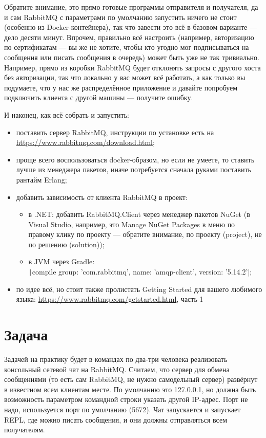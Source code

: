 \documentclass{../../text-style}
\begin{document}
Обратите внимание, это прямо готовые программы отправителя и получателя, да и сам RabbitMQ с параметрами по умолчанию запустить ничего не стоит (особенно из Docker-контейнера), так что завести это всё в базовом варианте --- дело десяти минут. Впрочем, правильно всё настроить (например, авторизацию по сертификатам --- вы же не хотите, чтобы кто угодно мог подписываться на сообщения или писать сообщения в очередь) может быть уже не так тривиально. Например, прямо из коробки RabbitMQ будет отклонять запросы с другого хоста без авторизации, так что локально у вас может всё работать, а как только вы подумаете, что у нас же распределённое приложение и давайте попробуем подключить клиента с другой машины --- получите ошибку.

И наконец, как всё собрать и запустить:

\begin{itemize}
    \item поставить сервер RabbitMQ, инструкции по установке есть на \url{https://www.rabbitmq.com/download.html};
    \item проще всего воспользоваться docker-образом, но если не умеете, то ставить лучше из менеджера пакетов, иначе потребуется сначала руками поставить рантайм Erlang;
    \item добавить зависимость от клиента RabbitMQ в проект:
    \begin{itemize}
        \item в .NET: добавить RabbitMQ.Client через менеджер пакетов NuGet (в Visual Studio, например, это Manage NuGet Packages в меню по правому клику по проекту --- обратите внимание, по проекту (project), не по решению (solution));
        \item в JVM через Gradle: \\
        \texttt|compile group: 'com.rabbitmq', name: 'amqp-client', version: '5.14.2'|;
    \end{itemize}
    \item по идее всё, но стоит также пролистать Getting Started для вашего любимого языка: \url{https://www.rabbitmq.com/getstarted.html}, часть 1
\end{itemize}

\section{Задача}

Задачей на практику будет в командах по два-три человека реализовать консольный сетевой чат на RabbitMQ. Считаем, что сервер для обмена сообщениями (то есть сам RabbitMQ, не нужно самодельный сервер) развёрнут в известном всем клиентам месте. По умолчанию это 127.0.0.1, но должна быть возможность параметром командной строки указать другой IP-адрес. Порт не надо, используется порт по умолчанию (5672). Чат запускается и запускает REPL, где можно писать сообщения, и они должны отправляться всем получателям.
\end{document}
